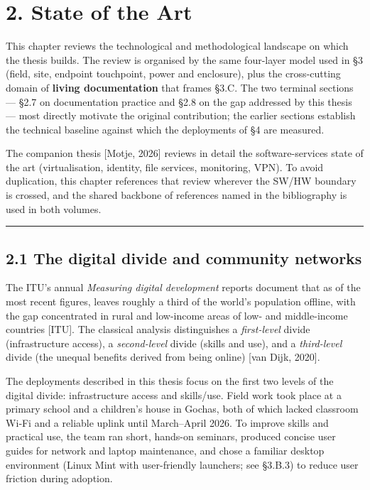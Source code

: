 \hypertarget{state-of-the-art}{%
\section{2. State of the Art}\label{state-of-the-art}}

This chapter reviews the technological and methodological landscape on
which the thesis builds. The review is organised by the same four-layer
model used in §3 (field, site, endpoint touchpoint, power and
enclosure), plus the cross-cutting domain of \textbf{living
documentation} that frames §3.C. The two terminal sections --- §2.7 on
documentation practice and §2.8 on the gap addressed by this thesis ---
most directly motivate the original contribution; the earlier sections
establish the technical baseline against which the deployments of §4 are
measured.

The companion thesis {[}Motje, 2026{]} reviews in detail the
software-services state of the art (virtualisation, identity, file
services, monitoring, VPN). To avoid duplication, this chapter
references that review wherever the SW/HW boundary is crossed, and the
shared backbone of references named in the bibliography is used in both
volumes.

\begin{center}\rule{0.5\linewidth}{0.5pt}\end{center}

\hypertarget{the-digital-divide-and-community-networks}{%
\subsection{2.1 The digital divide and community
networks}\label{the-digital-divide-and-community-networks}}

The ITU's annual \emph{Measuring digital development} reports document
that as of the most recent figures, leaves roughly a third of the
world's population offline, with the gap concentrated in rural and
low-income areas of low- and middle-income countries {[}ITU{]}. The
classical analysis distinguishes a \emph{first-level} divide
(infrastructure access), a \emph{second-level} divide (skills and use),
and a \emph{third-level} divide (the unequal benefits derived from being
online) {[}van Dijk, 2020{]}.

The deployments described in this thesis focus on the first two levels
of the digital divide: infrastructure access and skills/use. Field work
took place at a primary school and a children's house in Gochas, both of
which lacked classroom Wi‑Fi and a reliable uplink until March--April
2026. To improve skills and practical use, the team ran short, hands-on
seminars, produced concise user guides for network and laptop
maintenance, and chose a familiar desktop environment (Linux Mint with
user-friendly launchers; see §3.B.3) to reduce user friction during
adoption.

